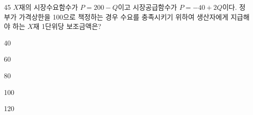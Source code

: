 \begin{question}{45}
$X$재의 시장수요함수가 $P=200-Q$이고 시장공급함수가 $P=-40+2Q$이다. 정부가 가격상한을 100으로 책정하는 경우 수요를 충족시키기 위하여 생산자에게 지급해야 하는 $X$재 1단위당 보조금액은?
\begin{choices}
  \item 40
  \item 60
  \item 80
  \item 100
  \item 120
\end{choices}
\end{question}
